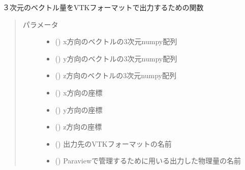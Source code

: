\documentclass[letterpaper,10pt,dvipdfmx,report]{sphinxmanual}
\begin{document}
\begin{fulllineitems}
\label{\detokenize{paraview:R2D2.vtk.write_vtk.write_3D_vector}}
３次元のベクトル量をVTKフォーマットで出力するための関数
\begin{quote}\begin{description}
\item[{パラメータ}] \leavevmode\begin{itemize}
\item {} 
 () \sphinxhyphen{}\sphinxhyphen{} x方向のベクトルの3次元numpy配列

\item {} 
 () \sphinxhyphen{}\sphinxhyphen{} y方向のベクトルの3次元numpy配列

\item {} 
 () \sphinxhyphen{}\sphinxhyphen{} z方向のベクトルの3次元numpy配列

\item {} 
 () \sphinxhyphen{}\sphinxhyphen{} x方向の座標

\item {} 
 () \sphinxhyphen{}\sphinxhyphen{} y方向の座標

\item {} 
 () \sphinxhyphen{}\sphinxhyphen{} z方向の座標

\item {} 
 () \sphinxhyphen{}\sphinxhyphen{} 出力先のVTKフォーマットの名前

\item {} 
 () \sphinxhyphen{}\sphinxhyphen{} Paraviewで管理するために用いる出力した物理量の名前

\end{itemize}

\end{description}\end{quote}

\end{fulllineitems}
\end{document}
